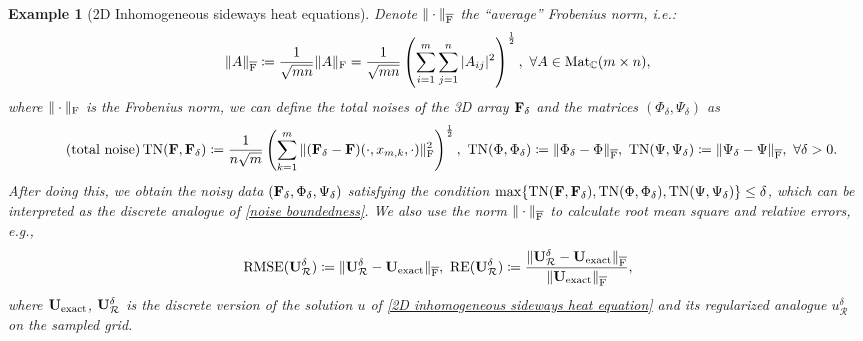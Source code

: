 \documentclass[oneside,11pt]{book}
\numberwithin{equation}{section}
\newtheorem{example}{Example}[section]
\begin{document}
\begin{example}[2D Inhomogeneous sideways heat equations]
    Denote $\|\cdot\|_{\overline{\rm F}}$ the ``average'' Frobenius norm, i.e.:
    \begin{align*}
        \|A\|_{\overline{\rm F}}\coloneqq\frac{1}{\sqrt{mn}}\|A\|_{\rm F} = \frac{1}{\sqrt{mn}}\left(\sum_{i=1}^m\sum_{j=1}^n |A_{ij}|^2\right)^{\frac{1}{2}},\ \forall A\in\operatorname{Mat}_\mathbb{C}(m\times n),
    \end{align*}
    where $\|\cdot\|_{\rm F}$ is the Frobenius norm, we can define the total noises of the 3D array ${\bf F}_\delta$ and the matrices $(\Phi_\delta,\Psi_\delta)$ as
    \begin{align}
        \label{total noise}
        \tag{total noise}
        \operatorname{TN}({\bf F},{\bf F}_\delta)\coloneqq\frac{1}{n\sqrt{m}}\left(\sum_{k=1}^m \|({\bf F}_\delta - {\bf F})(\cdot,x_{m,k},\cdot)\|_{\rm F}^2\right)^{\frac{1}{2}},\ \operatorname{TN}(\Phi,\Phi_\delta)\coloneqq\|\Phi_\delta - \Phi\|_{\overline{\rm F}},\ \operatorname{TN}(\Psi,\Psi_\delta)\coloneqq\|\Psi_\delta - \Psi\|_{\overline{\rm F}},\ \forall\delta > 0.
    \end{align}
    After doing this, we obtain the noisy data $({\bf F}_\delta,\Phi_\delta,\Psi_\delta)$ satisfying the condition $\max\{\operatorname{TN}({\bf F},{\bf F}_\delta),\operatorname{TN}(\Phi,\Phi_\delta),\operatorname{TN}(\Psi,\Psi_\delta)\}\le\delta$, which can be interpreted as the discrete analogue of \eqref{noise boundedness}. We also use the norm $\|\cdot\|_{\overline{\rm F}}$ to calculate root mean square and relative errors, e.g.,
    \begin{align*}
        \operatorname{RMSE}({\bf U}_\mathcal{R}^\delta)\coloneqq\|{\bf U}_\mathcal{R}^\delta - {\bf U}_{\rm exact}\|_{\overline{\rm F}},\ \operatorname{RE}({\bf U}_\mathcal{R}^\delta)\coloneqq\frac{\|{\bf U}_\mathcal{R}^\delta - {\bf U}_{\rm exact}\|_{\overline{\rm F}}}{\|{\bf U}_{\rm exact}\|_{\overline{\rm F}}},
    \end{align*}
    where ${\bf U}_{\rm exact}$, ${\bf U}_\mathcal{R}^\delta$ is the discrete version of the solution $u$ of \eqref{2D inhomogeneous sideways heat equation} and its regularized analogue $u_\mathcal{R}^\delta$ on the sampled grid.
\end{example}
\end{document}
